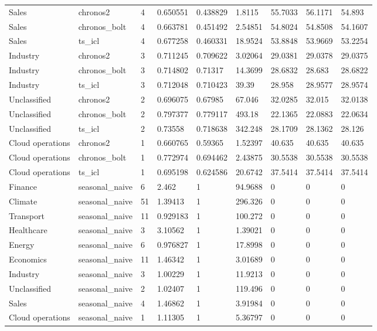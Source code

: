 \begin{tabular}{lllllllll}
Sales & chronos2 & 4 & 0.650551 & 0.438829 & 1.8115 & 55.7033 & 56.1171 & 54.893 \\
Sales & chronos\_bolt & 4 & 0.663781 & 0.451492 & 2.54851 & 54.8024 & 54.8508 & 54.1607 \\
Sales & ts\_icl & 4 & 0.677258 & 0.460331 & 18.9524 & 53.8848 & 53.9669 & 53.2254 \\
Industry & chronos2 & 3 & 0.711245 & 0.709622 & 3.02064 & 29.0381 & 29.0378 & 29.0375 \\
Industry & chronos\_bolt & 3 & 0.714802 & 0.71317 & 14.3699 & 28.6832 & 28.683 & 28.6822 \\
Industry & ts\_icl & 3 & 0.712048 & 0.710423 & 39.39 & 28.958 & 28.9577 & 28.9574 \\
Unclassified & chronos2 & 2 & 0.696075 & 0.67985 & 67.046 & 32.0285 & 32.015 & 32.0138 \\
Unclassified & chronos\_bolt & 2 & 0.797377 & 0.779117 & 493.18 & 22.1365 & 22.0883 & 22.0634 \\
Unclassified & ts\_icl & 2 & 0.73558 & 0.718638 & 342.248 & 28.1709 & 28.1362 & 28.126 \\
Cloud operations & chronos2 & 1 & 0.660765 & 0.59365 & 1.52397 & 40.635 & 40.635 & 40.635 \\
Cloud operations & chronos\_bolt & 1 & 0.772974 & 0.694462 & 2.43875 & 30.5538 & 30.5538 & 30.5538 \\
Cloud operations & ts\_icl & 1 & 0.695198 & 0.624586 & 20.6742 & 37.5414 & 37.5414 & 37.5414 \\
Finance & seasonal\_naive & 6 & 2.462 & 1 & 94.9688 & 0 & 0 & 0 \\
Climate & seasonal\_naive & 51 & 1.39413 & 1 & 296.326 & 0 & 0 & 0 \\
Transport & seasonal\_naive & 11 & 0.929183 & 1 & 100.272 & 0 & 0 & 0 \\
Healthcare & seasonal\_naive & 3 & 3.10562 & 1 & 1.39021 & 0 & 0 & 0 \\
Energy & seasonal\_naive & 6 & 0.976827 & 1 & 17.8998 & 0 & 0 & 0 \\
Economics & seasonal\_naive & 11 & 1.46342 & 1 & 3.01689 & 0 & 0 & 0 \\
Industry & seasonal\_naive & 3 & 1.00229 & 1 & 11.9213 & 0 & 0 & 0 \\
Unclassified & seasonal\_naive & 2 & 1.02407 & 1 & 119.496 & 0 & 0 & 0 \\
Sales & seasonal\_naive & 4 & 1.46862 & 1 & 3.91984 & 0 & 0 & 0 \\
Cloud operations & seasonal\_naive & 1 & 1.11305 & 1 & 5.36797 & 0 & 0 & 0 \\
\bottomrule
\end{tabular}
